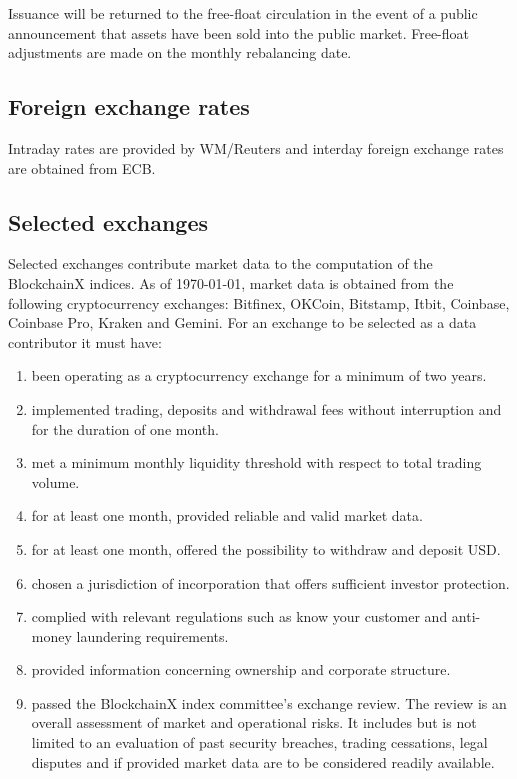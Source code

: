 \documentclass{article}
\begin{document}
Issuance will be returned to the free-float circulation in the event of
a public announcement that assets have been sold into the public market.
Free-float adjustments are made on the monthly rebalancing date.

\subsection{Foreign exchange rates}\label{foreign-exchange-rates}

Intraday rates are provided by WM/Reuters and interday foreign exchange
rates are obtained from ECB.

\subsection{Selected exchanges}\label{sec:selected-exchanges}

Selected exchanges contribute market data to the computation of the
BlockchainX indices. As of \today, market data is obtained from the
following cryptocurrency exchanges: Bitfinex, OKCoin, Bitstamp, Itbit,
Coinbase, Coinbase Pro, Kraken and Gemini. For an exchange to be
selected as a data contributor it must have:

\begin{enumerate}
\def\labelenumi{\arabic{enumi}.}
\item
  been operating as a cryptocurrency exchange for a minimum of two
  years.
\item
  implemented trading, deposits and withdrawal fees without interruption
  and for the duration of one month.
\item
  met a minimum monthly liquidity threshold with respect to total
  trading volume.
\item
  for at least one month, provided reliable and valid market data.
\item
  for at least one month, offered the possibility to withdraw and
  deposit USD.
\item
  chosen a jurisdiction of incorporation that offers sufficient investor
  protection.
\item
  complied with relevant regulations such as know your customer and
  anti-money laundering requirements.
\item
  provided information concerning ownership and corporate structure.
\item
  passed the BlockchainX index committee's exchange review. The review
  is an overall assessment of market and operational risks. It includes
  but is not limited to an evaluation of past security breaches, trading
  cessations, legal disputes and if provided market data are to be
  considered readily available.
\end{enumerate}
\end{document}
